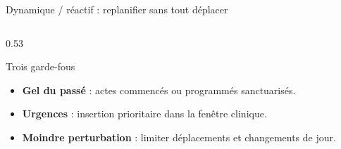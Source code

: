 \begin{frame}{Dynamique / réactif : replanifier sans tout déplacer}
  \scriptsize
  \begin{columns}[T,onlytextwidth]
    \begin{column}{0.53\textwidth}
      \begin{block}{Trois garde-fous}
        \begin{itemize}
          \item \textbf{Gel du passé} : actes commencés ou programmés
            sanctuarisés.
          \item \textbf{Urgences} : insertion prioritaire dans la fenêtre
            clinique.
          \item \textbf{Moindre perturbation} : limiter déplacements et
            changements de jour.
        \end{itemize}
      \end{block}

    \end{column}


\end{columns}
\end{frame}
